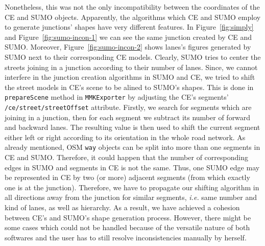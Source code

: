 Nonetheless, this was not the only incompatibility between the coordinates of the CE and SUMO objects. Apparently, the algorithms which CE and SUMO employ to generate junctions' shapes have very different features. In Figure~\ref{fig:simply} and Figure~\ref{fig:sumo-incon-1} we can see the same junction created by CE and SUMO. Moreover, Figure~\ref{fig:sumo-incon-2} shows lanes's figures generated by SUMO next to their corresponding CE models. Clearly, SUMO tries to center the streets joining in a junction according to their number of lanes. Since, we cannot interfere in the junction creation algorithms in SUMO and CE, we tried to shift the street models in CE's scene to be alined to SUMO's shapes. This is done in \texttt{prepareScene} method in \texttt{MMKExporter} by adjusting the CE's segments' \texttt{/ce/street/streetOffset} attribute. Firstly, we search for segments which are joining in a junction, then for each segment we subtract its number of forward and backward lanes. The resulting value is then used to shift the current segment either left or right according to its orientation in the whole road network. As already mentioned, OSM \texttt{way} objects can be split into more than one segments in CE and SUMO. Therefore, it could happen that the number of corresponding edges in SUMO and segments in CE is not the same. Thus, one SUMO edge may be represented in CE by two (or more) adjacent segments (from which exactly one is at the junction). Therefore, we have to propagate our shifting algorithm in all directions away from the junction for similar segments, \emph{i.e.} same number and kind of lanes, as well as hierarchy. As a result, we have achieved a cohesion between CE's and SUMO's shape generation process. However, there might be some cases which could not be handled because of the versatile nature of both softwares and the user has to still resolve inconsistencies manually by herself.\\

